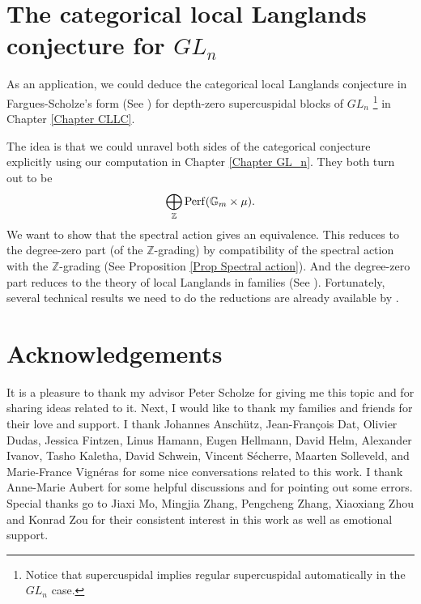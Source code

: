 \section{The categorical local Langlands conjecture for $GL_n$}

As an application, we could deduce the categorical local Langlands conjecture in Fargues-Scholze's form (See \cite[Conjecture X.3.5]{fargues2021geometrization}) for depth-zero supercuspidal blocks of $GL_n$ \footnote{Notice that supercuspidal implies regular supercuspidal automatically in the $GL_n$ case.} in Chapter \ref{Chapter CLLC}. 

The idea is that we could unravel both sides of the categorical conjecture explicitly using our computation in Chapter \ref{Chapter GL_n}. They both turn out to be
$$\bigoplus_{\mathbb{Z}}\operatorname{\operatorname{Perf}}(\mathbb{G}_m \times \mu).$$ 
We want to show that the spectral action gives an equivalence. This reduces to the degree-zero part (of the $\mathbb{Z}$-grading) by compatibility of the spectral action with the $\mathbb{Z}$-grading (See Proposition \ref{Prop Spectral action}). And the degree-zero part reduces to the theory of local Langlands in families (See \cite{helm2018converse}). Fortunately, several technical results we need to do the reductions are already available by \cite{zou2022categorical}.

\section{Acknowledgements}

It is a pleasure to thank my advisor Peter Scholze for giving me this topic and for sharing ideas related to it. Next, I would like to thank my families and friends for their love and support. I thank Johannes Anschütz, Jean-François Dat, Olivier Dudas, Jessica Fintzen, Linus Hamann, Eugen Hellmann, David Helm, Alexander Ivanov, Tasho Kaletha, David Schwein, Vincent Sécherre, Maarten Solleveld, and Marie-France Vignéras for some nice conversations related to this work. I thank Anne-Marie Aubert for some helpful discussions and for pointing out some errors. Special thanks go to Jiaxi Mo, Mingjia Zhang, Pengcheng Zhang, Xiaoxiang Zhou and Konrad Zou for their consistent interest in this work as well as emotional support.
